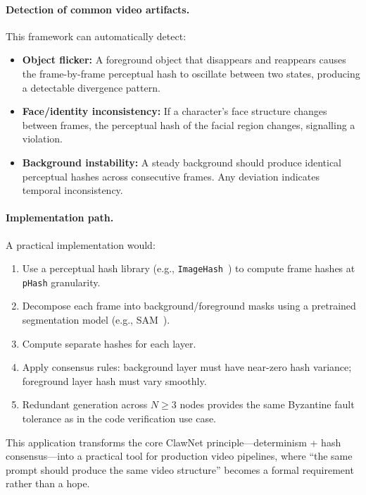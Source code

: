 \documentclass[11pt,a4paper]{article}
\begin{document}
\paragraph{Detection of common video artifacts.}
This framework can automatically detect:
\begin{itemize}
    \item \textbf{Object flicker:} A foreground object that disappears
          and reappears causes the frame-by-frame perceptual hash to
          oscillate between two states, producing a detectable
          divergence pattern.
    \item \textbf{Face/identity inconsistency:} If a character's face
          structure changes between frames, the perceptual hash of the
          facial region changes, signalling a violation.
    \item \textbf{Background instability:} A steady background should
          produce identical perceptual hashes across consecutive frames.
          Any deviation indicates temporal inconsistency.
\end{itemize}

\paragraph{Implementation path.}
A practical implementation would:
\begin{enumerate}
    \item Use a perceptual hash library (e.g.,
          \texttt{ImageHash}~\cite{imagehash}) to compute frame hashes
          at \texttt{pHash} granularity.
    \item Decompose each frame into background/foreground masks using
          a pretrained segmentation model (e.g., SAM~\cite{kirillov2023sam}).
    \item Compute separate hashes for each layer.
    \item Apply consensus rules: background layer must have near-zero
          hash variance; foreground layer hash must vary smoothly.
    \item Redundant generation across $N \geq 3$ nodes provides the
          same Byzantine fault tolerance as in the code verification
          use case.
\end{enumerate}

This application transforms the core ClawNet principle---determinism +
hash consensus---into a practical tool for production video pipelines,
where ``the same prompt should produce the same video structure''
becomes a formal requirement rather than a hope.
\end{document}
